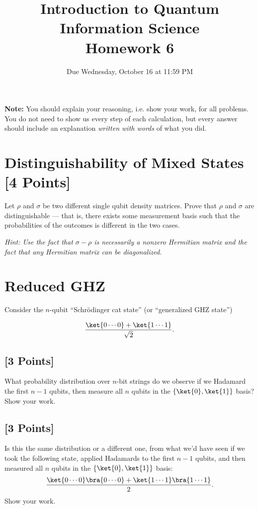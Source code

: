 \documentclass[11pt]{article}
\providecommand{\due}{Due Wednesday, October 16 at 11:59 PM}
\begin{document}
\title{Introduction to Quantum Information Science\\Homework 6}
\date{\due}

\maketitle

\textbf{Note:} You should explain your reasoning, i.e. show your work, for all problems. You do not need to show us every step of each calculation, but every answer should include an explanation \emph{written with words} of what you did.

\section{Distinguishability of Mixed States [4 Points]}  Let $\rho$ and $\sigma$ be two different single qubit density matrices. Prove that $\rho$ and $\sigma$ are distinguishable --- that is, there exists some measurement basis such that the probabilities of the outcomes is different in the two cases. 

\noindent \textit{Hint: Use the fact that $\sigma-\rho$ is necessarily a nonzero Hermitian matrix and the fact that any Hermitian matrix can be diagonalized.}


\section{Reduced GHZ} Consider the $n$-qubit ``Schrödinger cat state'' (or ``generalized GHZ state'')

\[
\frac{\ket{0\cdots 0} +	\ket{1\cdots1}}{\sqrt{2}}.
\]

\subsection{[3 Points]} What probability distribution over $n$-bit strings do we observe if
we Hadamard the first $n-1$ qubits, then measure all $n$ qubits in the
$\{\ket{0},\ket{1}\}$ basis? Show your work.


\subsection{[3 Points]} Is this the same distribution or a different one, from what we'd have seen if we took the following state, applied Hadamards to the first $n-1$ qubits, and then measured all $n$ qubits in the $\{\ket{0}, \ket{1}\}$ basis:  $$\frac{\ket{0\cdots 0}\bra{0\cdots0} +	\ket{1\cdots1}\bra{1\cdots1}}{2}.$$ Show your work.
\end{document}
